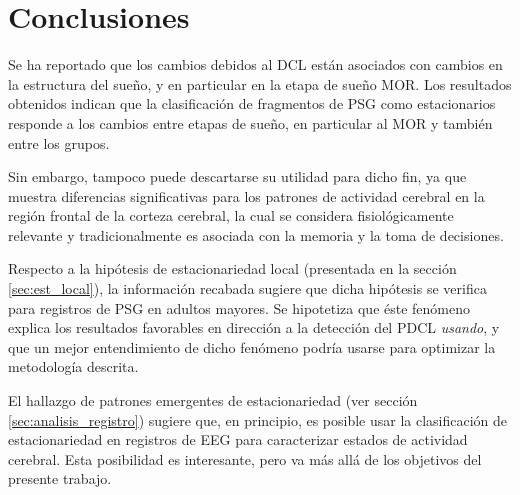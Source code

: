 \documentclass[12pt,letterpaper]{book}
\begin{document}

\section{Conclusiones}


Se ha reportado que los cambios debidos al DCL están asociados con cambios en la estructura del sueño, y en particular en la etapa de sueño MOR.
%
Los resultados obtenidos indican que la clasificación de fragmentos de PSG como estacionarios responde a los cambios entre etapas de sueño, en particular al MOR y también entre los grupos.

Sin embargo, tampoco puede descartarse su utilidad para dicho fin, ya que muestra diferencias significativas para los patrones de actividad cerebral en la región frontal de la corteza cerebral, la cual se considera fisiológicamente relevante y tradicionalmente es asociada con la memoria y la toma de decisiones.

Respecto a la hipótesis de estacionariedad local (presentada en la sección \ref{sec:est_local}), la información recabada sugiere que dicha hipótesis se verifica para registros de PSG en adultos mayores.
%
Se hipotetiza que éste fenómeno explica los resultados {favorables} en dirección a la detección del PDCL \textit{usando}, y que un mejor entendimiento de dicho fenómeno podría usarse para optimizar la metodología descrita.

El hallazgo de patrones emergentes de estacionariedad (ver sección \ref{sec:analisis_registro}) sugiere que, en principio, es posible usar la clasificación de estacionariedad en registros de EEG para caracterizar estados de actividad cerebral. 
%
Esta posibilidad es interesante, pero va más allá de los objetivos del presente trabajo.

\end{document}
